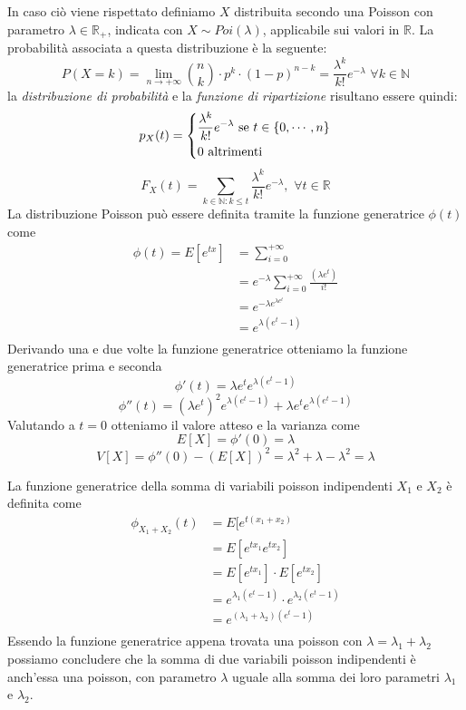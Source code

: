 \documentclass[a4paper,12pt, oneside]{book}
\newcommand{\numberset}{\mathbb}
\newcommand{\N}{\numberset{N}}
\newcommand{\R}{\numberset{R}}
\begin{document}
In caso ciò viene rispettato definiamo $X$ distribuita secondo una Poisson con parametro $\lambda \in \R_+$,
indicata con $X \sim Poi(\lambda)$, applicabile sui valori in $\R$.\newline
La probabilità associata a questa distribuzione è la seguente:
\[ P(X = k) = \lim_{n \to +\infty} \binom{n}{k} \cdot p^k \cdot (1-p)^{n-k} = \frac{\lambda^k}{k!} 
                                                                              e^{-\lambda} \,\, \forall k \in \N\]
la \textit{distribuzione di probabilità} e la \textit{funzione di ripartizione} risultano essere quindi:
\[p_X(t) = \begin{dcases}
           \frac{\lambda^k}{k!} e^{-\lambda} \mbox{ se } t \in \{0,\cdots, n\}\\
           0                                 \mbox{ altrimenti}\\
           \end{dcases}\]
        \[F_X(t) = \sum_{k \in \N:k \leq t} \frac{\lambda^k}{k!} e^{-\lambda},\,\,\forall t \in \R \]
La distribuzione Poisson può essere definita tramite la funzione generatrice $\phi(t)$ come 
\[ \begin{split}
    \phi(t) = E[e^{tx}] & = \sum _{i = 0}^{+\infty} \\
                        & = e^{-\lambda} \sum _{i = 0}^{+\infty} \frac{(\lambda e^t)}{i!} \\
                        & = e^{-\lambda e^{\lambda e^t}} \\
                        & = e^{\lambda(e^t - 1)} \\
    \end{split} \]
Derivando una e due volte la funzione generatrice otteniamo la funzione generatrice prima e seconda
\[ \phi'(t) = \lambda e^t e^{\lambda(e^t - 1)} \]
\[ \phi''(t) = (\lambda e^t)^2 e^{\lambda(e^t - 1)} + \lambda e^t e^{\lambda(e^t - 1)} \]
Valutando a $t = 0$ otteniamo il valore atteso e la varianza come
\[ E[X] = \phi'(0) = \lambda \]
\[ V[X] = \phi''(0) - (E[X])^2 = \lambda^2 + \lambda - \lambda^2 = \lambda \]

La funzione generatrice della somma di variabili poisson indipendenti $X_1$ e $X_2$ è definita come 
\[ \begin{split}
    \phi_{X_1 + X_2}(t) & = E[e^{t(x_1 + x_2)} \\
                        & = E[e^{tx_1} e^{tx_2}]\\
                        & = E[e^{tx_1}] \cdot E[e^{tx_2}]\\
                        & = e^{\lambda_1(e^t - 1)} \cdot e^{\lambda_2(e^t - 1)}\\
                        & = e^{(\lambda_1 + \lambda_2)(e^t - 1)}\\
    \end{split} \]
Essendo la funzione generatrice appena trovata una poisson con $\lambda = \lambda_1 + \lambda_2$ possiamo concludere
che la somma di due variabili poisson indipendenti è anch'essa una poisson, con parametro $\lambda$ uguale alla somma
dei loro parametri $\lambda_1$ e $\lambda_2$.
\end{document}
